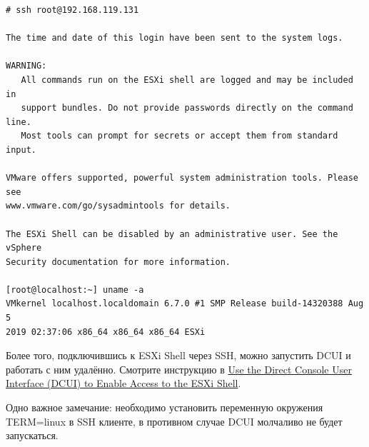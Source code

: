 \documentclass[14pt, a4paper]{article}
\begin{document}
\begin{lstlisting}
# ssh root@192.168.119.131

The time and date of this login have been sent to the system logs.

WARNING:
   All commands run on the ESXi shell are logged and may be included in 
   support bundles. Do not provide passwords directly on the command line.
   Most tools can prompt for secrets or accept them from standard input.
    
VMware offers supported, powerful system administration tools. Please see
www.vmware.com/go/sysadmintools for details.

The ESXi Shell can be disabled by an administrative user. See the vSphere
Security documentation for more information.

[root@localhost:~] uname -a
VMkernel localhost.localdomain 6.7.0 #1 SMP Release build-14320388 Aug 5
2019 02:37:06 x86_64 x86_64 x86_64 ESXi
\end{lstlisting}

Более того, подключившись к ESXi Shell через SSH, можно запустить DCUI и работать с ним удалённо.
Смотрите инструкцию в \href{https://docs.vmware.com/en/VMware-vSphere/6.7/com.vmware.vsphere.security.doc/GUID-94F0C54F-05E3-4E16-8027-0280B9ED1009.html}{Use the Direct Console User Interface (DCUI) to Enable Access to the ESXi Shell}.

Одно важное замечание: необходимо установить переменную окружения TERM=linux в SSH клиенте,
в противном случае DCUI молчаливо не будет запускаться.

\begin{figure}[h]%
    \centering
    \label{framework} %
\end{figure}
\end{document}

